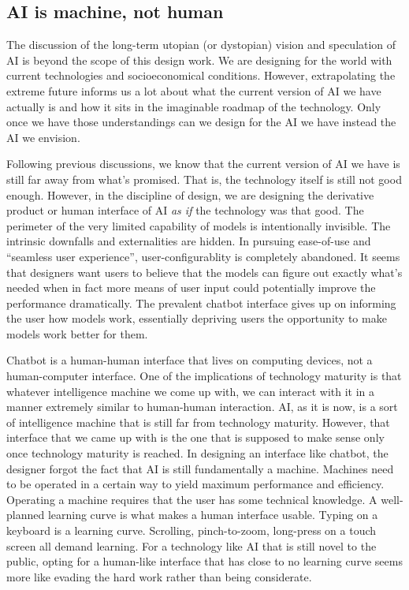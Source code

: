 \documentclass[12pt]{article}
\begin{document}
\subsection{AI is machine, not human}
The discussion of the long-term utopian (or dystopian) vision and speculation of AI is beyond the scope of this design work. We are designing for the world with current technologies and socioeconomical conditions. However, extrapolating the extreme future informs us a lot about what the current version of AI we have actually is and how it sits in the imaginable roadmap of the technology. Only once we have those understandings can we design for the AI we have instead the AI we envision.

Following previous discussions, we know that the current version of AI we have is still far away from what's promised. That is, the technology itself is still not good enough. However, in the discipline of design, we are designing the derivative product or human interface of AI \textit{as if} the technology was that good. The perimeter of the very limited capability of models is intentionally invisible. The intrinsic downfalls and externalities are hidden. In pursuing ease-of-use and ``seamless user experience'', user-configurablity is completely abandoned. It seems that designers want users to believe that the models can figure out exactly what's needed when in fact more means of user input could potentially improve the performance dramatically. The prevalent chatbot interface gives up on informing the user how models work, essentially depriving users the opportunity to make models work better for them.

Chatbot is a human-human interface that lives on computing devices, not a human-computer interface. One of the implications of technology maturity is that whatever intelligence machine we come up with, we can interact with it in a manner extremely similar to human-human interaction. AI, as it is now, is a sort of intelligence machine that is still far from technology maturity. However, that interface that we came up with is the one that is supposed to make sense only once technology maturity is reached. In designing an interface like chatbot, the designer forgot the fact that AI is still fundamentally a machine. Machines need to be operated in a certain way to yield maximum performance and efficiency. Operating a machine requires that the user has some technical knowledge. A well-planned learning curve is what makes a human interface usable. Typing on a keyboard is a learning curve. Scrolling, pinch-to-zoom, long-press on a touch screen all demand learning. For a technology like AI that is still novel to the public, opting for a human-like interface that has close to no learning curve seems more like evading the hard work rather than being considerate.
\end{document}
